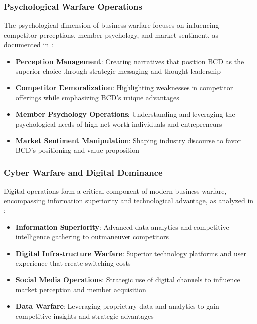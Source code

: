 \subsubsection{Psychological Warfare Operations}

The psychological dimension of business warfare focuses on influencing competitor perceptions, member psychology, and market sentiment, as documented in \citep{simas_humanai_interaction_an}:

\begin{itemize}
    \item \textbf{Perception Management}: Creating narratives that position BCD as the superior choice through strategic messaging and thought leadership
    \item \textbf{Competitor Demoralization}: Highlighting weaknesses in competitor offerings while emphasizing BCD's unique advantages
    \item \textbf{Member Psychology Operations}: Understanding and leveraging the psychological needs of high-net-worth individuals and entrepreneurs
    \item \textbf{Market Sentiment Manipulation}: Shaping industry discourse to favor BCD's positioning and value proposition
\end{itemize}

\subsubsection{Cyber Warfare and Digital Dominance}

Digital operations form a critical component of modern business warfare, encompassing information superiority and technological advantage, as analyzed in \citep{ferede_artificial_intelligence_ai}:

\begin{itemize}
    \item \textbf{Information Superiority}: Advanced data analytics and competitive intelligence gathering to outmaneuver competitors
    \item \textbf{Digital Infrastructure Warfare}: Superior technology platforms and user experience that create switching costs
    \item \textbf{Social Media Operations}: Strategic use of digital channels to influence market perception and member acquisition
    \item \textbf{Data Warfare}: Leveraging proprietary data and analytics to gain competitive insights and strategic advantages
\end{itemize}

